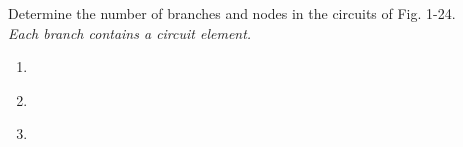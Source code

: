 Determine the number of branches and nodes in the circuits of Fig. 1-24. \\
\emph{Each branch contains a circuit element.}

\begin{enumerate}[leftmargin=2cm,labelsep=.5cm,label=\bfseries\alph*)]
	\item
	\\[1cm]
	
	\item
	\\[1cm]
	
	\item
	\\[1cm]
\end{enumerate}